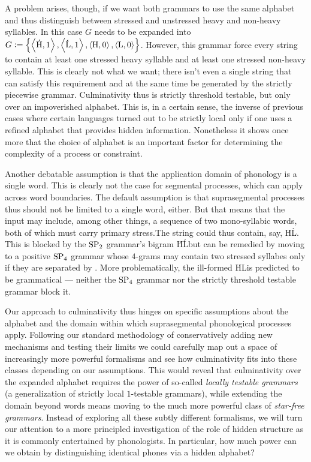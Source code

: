 A problem arises, though, if we want both grammars to use the same alphabet and thus distinguish between stressed and unstressed heavy and non-heavy syllables.
In this case $G$ needs to be expanded into
\(
    G \mathrel{\mathop:}= \left \{ 
        \left \langle \mathit{\text{\'H}},1 \right \rangle ,
        \left \langle \mathit{\text{\'L}},1 \right \rangle ,
        \left \langle \mathit{\text{H}},0 \right \rangle ,
        \left \langle \mathit{\text{L}},0 \right \rangle 
     \right \}
\).
However, this grammar force every string to contain at least one stressed heavy syllable and at least one stressed non-heavy syllable.
This is clearly not what we want;
there isn't even a single string that can satisfy this requirement and at the same time be generated by the strictly piecewise grammar.
Culminativity thus is strictly threshold testable, but only over an impoverished alphabet.
This is, in a certain sense, the inverse of previous cases where certain languages turned out to be strictly local only if one uses a refined alphabet that provides hidden information.
Nonetheless it shows once more that the choice of alphabet is an important factor for determining the complexity of a process or constraint.

Another debatable assumption is that the application domain of phonology is a single word.
This is clearly not the case for segmental processes, which can apply across word boundaries.
The default assumption is that suprasegmental processes thus should not be limited to a single word, either.
But that means that the input may include, among other things, a sequence of two mono-syllabic words, both of which must carry primary stress.The string could thus contain, say, \LeftEdge \'H\RightEdge\LeftEdge \'L\RightEdge.
This is blocked by the $\mathrm{SP}_2$ grammar's bigram \'H\'L\@ but can be remedied by moving to a positive $\mathrm{SP}_4$ grammar whose $4$-grams may contain two stressed syllabes only if they are separated by \RightEdge\LeftEdge.
More problematically, the ill-formed \LeftEdge \'H\RightEdge\LeftEdge L\RightEdge is predicted to be grammatical --- neither the $\mathrm{SP}_4$ grammar nor the strictly threshold testable grammar block it.

Our approach to culminativity thus hinges on specific assumptions about the alphabet and the domain within which suprasegmental phonological processes apply.
Following our standard methodology of conservatively adding new mechanisms and testing their limits we could carefully map out a space of increasingly more powerful formalisms and see how culminativity fits into these classes depending on our assumptions.
This would reveal that culminativity over the expanded alphabet requires the power of so-called \emph{locally testable grammars} (a generalization of strictly local $1$-testable grammars), while extending the domain beyond words means moving to the much more powerful class of \emph{star-free grammars}.
Instead of exploring all these subtly different formalisms, we will turn our attention to a more principled investigation of the role of hidden structure as it is commonly entertained by phonologists.
In particular, how much power can we obtain by distinguishing identical phones via a hidden alphabet?

